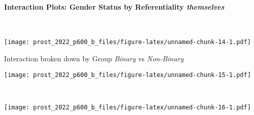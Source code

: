 \documentclass[
]{article}
\begin{document}
\hypertarget{interaction-plots-gender-status-by-referentiality-themselves}{%
\paragraph{\texorpdfstring{Interaction Plots: Gender Status by
Referentiality
\emph{themselves}}{Interaction Plots: Gender Status by Referentiality themselves}}\label{interaction-plots-gender-status-by-referentiality-themselves}}

~

\texttt{[image: prost\_2022\_p600\_b\_files/figure-latex/unnamed-chunk-14-1.pdf]}

Interaction broken down by Group \emph{Binary} vs \emph{Non-Binary}

\texttt{[image: prost\_2022\_p600\_b\_files/figure-latex/unnamed-chunk-15-1.pdf]}

~

\texttt{[image: prost\_2022\_p600\_b\_files/figure-latex/unnamed-chunk-16-1.pdf]}
\end{document}
